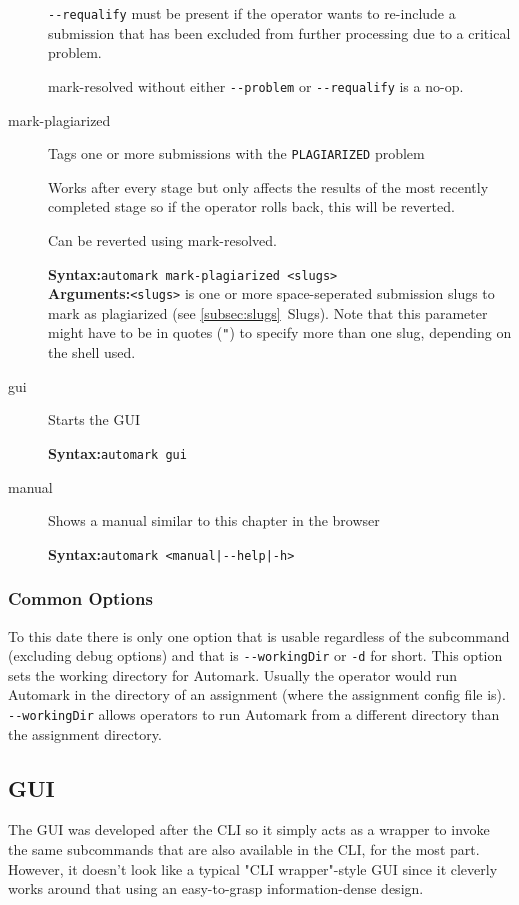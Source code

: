 \documentclass[12pt,a4paper,oneside]{report}
\begin{document}
\begin{description}
		\lstinline|--requalify| must be present if the operator wants to re-include a submission that has been excluded from further processing due to a critical problem.

		mark-resolved without either \lstinline|--problem| or \lstinline|--requalify| is a no-op.

		\item[mark-plagiarized] Tags one or more submissions with the \lstinline|PLAGIARIZED| problem

		Works after every stage but only affects the results of the most recently completed stage so if the operator rolls back, this will be reverted.

		Can be reverted using mark-resolved.

		\textbf{Syntax:}\tabto{75pt}\lstinline|automark mark-plagiarized <slugs>|\\
		\textbf{Arguments:}\tabto{75pt}\lstinline|<slugs>| is one or more space-seperated submission slugs to mark as plagiarized (see \ref{subsec:slugs}~Slugs). Note that this parameter might have to be in quotes (\lstinline|"|) to specify more than one slug, depending on the shell used.

		\item[gui] Starts the GUI

		\textbf{Syntax:}\tabto{75pt}\lstinline|automark gui|

		\item[manual] Shows a manual similar to this chapter in the browser

		\textbf{Syntax:}\tabto{75pt}\lstinline[mathescape]!automark <manual|--help|-h>!
	\end{description}

	\subsubsection{Common Options}
	To this date there is only one option that is usable regardless of the subcommand (excluding debug options) and that is \lstinline|--workingDir| or \lstinline|-d| for short. This option sets the working directory for Automark. Usually the operator would run Automark in the directory of an assignment (where the assignment config file is). \lstinline|--workingDir| allows operators to run Automark from a different directory than the assignment directory.

	\subsection{GUI}
	The GUI was developed after the CLI so it simply acts as a wrapper to invoke the same subcommands that are also available in the CLI, for the most part. However, it doesn't look like a typical "CLI wrapper"-style GUI since it cleverly works around that using an easy-to-grasp information-dense design.
\end{document}
